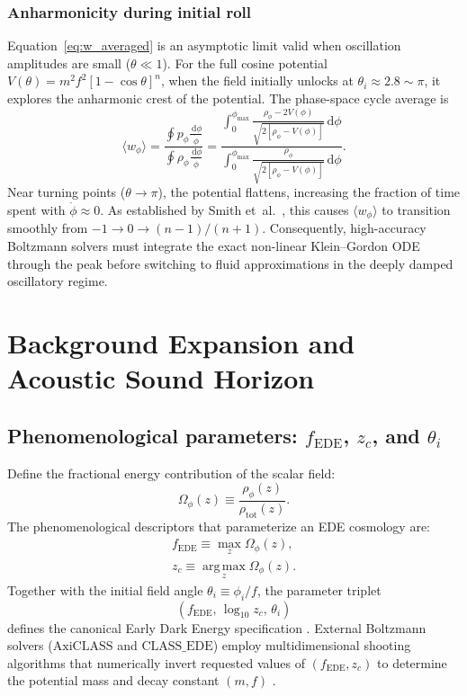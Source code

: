 \documentclass[11pt]{article}
\newcommand{\dd}{\,\mathrm d}
\newcommand{\fEDE}{f_{\mathrm{EDE}}}
\newcommand{\zc}{z_c}
\newcommand{\thetai}{\theta_i}
\begin{document}
\subsubsection{Anharmonicity during initial roll}
Equation~\eqref{eq:w_averaged} is an asymptotic limit valid when oscillation amplitudes are small ($\theta \ll 1$). For the full cosine potential $V(\theta) = m^2f^2[1-\cos\theta]^n$, when the field initially unlocks at $\theta_i \approx 2.8 \sim \pi$, it explores the anharmonic crest of the potential. The phase-space cycle average is
\begin{equation}
\langle w_\phi \rangle = \frac{\oint p_\phi \frac{\dd\phi}{\dot\phi}}{\oint \rho_\phi \frac{\dd\phi}{\dot\phi}} = \frac{\int_0^{\phi_{\mathrm{max}}} \frac{\rho_\phi - 2V(\phi)}{\sqrt{2[\rho_\phi - V(\phi)]}}\dd\phi}{\int_0^{\phi_{\mathrm{max}}} \frac{\rho_\phi}{\sqrt{2[\rho_\phi - V(\phi)]}}\dd\phi}.
\end{equation}
Near turning points ($\theta \to \pi$), the potential flattens, increasing the fraction of time spent with $\dot\phi \approx 0$. As established by Smith et~al.~\cite{smith2020oscillating}, this causes $\langle w_\phi \rangle$ to transition smoothly from $-1 \to 0 \to (n-1)/(n+1)$. Consequently, high-accuracy Boltzmann solvers must integrate the exact non-linear Klein--Gordon ODE through the peak before switching to fluid approximations in the deeply damped oscillatory regime.

\section{Background Expansion and Acoustic Sound Horizon}
\label{sec:background_expansion}

\subsection{Phenomenological parameters: \texorpdfstring{$f_{\mathrm{EDE}}$}{fEDE}, \texorpdfstring{$z_c$}{zc}, and \texorpdfstring{$\theta_i$}{thetai}}
Define the fractional energy contribution of the scalar field:
\begin{equation}
\boxed{\Omega_\phi(z) \equiv \frac{\rho_\phi(z)}{\rho_{\mathrm{tot}}(z)}}.
\end{equation}
The phenomenological descriptors that parameterize an EDE cosmology are:
\begin{align}
\boxed{\fEDE \equiv \max_z \Omega_\phi(z)},\\
\boxed{\zc \equiv \operatorname*{arg\,max}_z \Omega_\phi(z)}.
\end{align}
Together with the initial field angle $\thetai \equiv \phi_i / f$, the parameter triplet
\begin{equation}
\left( \fEDE,\, \log_{10}\zc,\, \thetai \right)
\end{equation}
defines the canonical Early Dark Energy specification \cite{poulin2019ede}. External Boltzmann solvers ($\text{AxiCLASS}$ and $\text{CLASS\_EDE}$) employ multidimensional shooting algorithms that numerically invert requested values of $(\fEDE, \zc)$ to determine the potential mass and decay constant $(m, f)$ \cite{axiclass,classede}.
\end{document}
